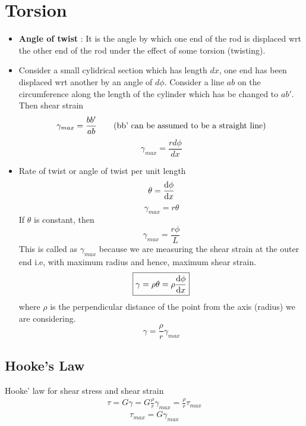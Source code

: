 \documentclass{article}
\begin{document}
\section{Torsion}
\label{torsion}
	\begin{itemize}
		\item \textbf{Angle of twist} : It is the angle by which one end of the rod is displaced wrt the other end of the rod under the effect of some torsion (twisting).
		\item Consider a small cylidrical section which has length $dx$, one end has been displaced wrt another by an angle of $d\phi$. Consider a line $ab$ on the circumference along the length of the cylinder which has be changed to $ab'$. Then shear strain 
		\begin{equation*}
			\gamma_{max} = \frac{bb'}{ab} \qquad (\text{bb' can be assumed to be a straight line})\\
		\end{equation*}
			\[\gamma_{max} = \frac{r d\phi}{dx}\]


		\item Rate of twist or angle of twist per unit length
		\[\theta = \dv{\phi}{x}\]
		\[\gamma_{max} = r \theta\]
		If $\theta$ is constant, then
		\[\gamma_{max}= \frac{r \phi}{L}\] 
		This is called as $\gamma_{max}$ because we are measuring the shear strain at the outer end i.e, with maximum radius and hence, maximum shear strain.
		\[\boxed{\gamma = \rho \theta = \rho \dv{\phi}{x}}\]
		where $\rho$ is the perpendicular distance of the point from the axis (radius) we are considering.
		\[\boxed{\gamma = \frac{\rho}{r} \gamma_{max} }\]

	\end{itemize}
	\subsection{Hooke's Law}
		Hooke' law for shear stress and shear strain
		\begin{align*}
			\tau = G \gamma
				 = G \frac{\rho}{r}\gamma_{max}
				 = \frac{\rho}{r}\tau_{max}
		\end{align*}
		\[\tau_{max} = G \gamma_{max}\]
\end{document}

